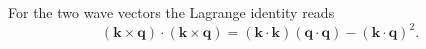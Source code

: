 \documentclass{article}
\begin{document}
For the two wave vectors the Lagrange identity reads
\begin{equation}
(\mathbf{k}\times\mathbf{q})\cdot(\mathbf{k}\times\mathbf{q}) = (\mathbf{k}\cdot\mathbf{k})(\mathbf{q}\cdot\mathbf{q}) - (\mathbf{k}\cdot\mathbf{q})^2 .
\label{eq:lag}
\end{equation}
\end{document}
